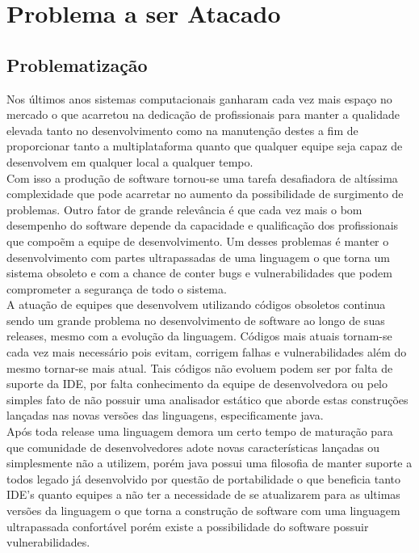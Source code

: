 \chapter{Problema a ser Atacado}
\section{Problematização}

Nos últimos anos sistemas computacionais ganharam cada vez mais espaço no mercado o que acarretou na dedicação de profissionais para manter a qualidade elevada tanto no desenvolvimento como na manutenção destes a fim de proporcionar tanto a multiplataforma quanto que qualquer equipe seja capaz de desenvolvem em qualquer local a qualquer tempo.\\

Com isso a produção de software tornou-se uma tarefa desafiadora de altíssima complexidade que pode acarretar no aumento da possibilidade de surgimento de problemas. Outro fator de grande relevância é que cada vez mais o bom desempenho do software depende da capacidade e qualificação dos profissionais que compoẽm a equipe de desenvolvimento. Um desses problemas é manter o desenvolvimento com partes ultrapassadas de uma linguagem o que torna um sistema obsoleto e com a chance de conter bugs e vulnerabilidades que podem comprometer a segurança de todo o sistema.\\


A atuação de equipes que desenvolvem utilizando códigos obsoletos continua sendo um grande problema no desenvolvimento de software ao longo de suas releases, mesmo com a evolução da linguagem. Códigos mais atuais tornam-se cada vez mais necessário pois evitam, corrigem falhas e vulnerabilidades além do mesmo tornar-se mais atual. Tais códigos não evoluem podem ser por falta de suporte da IDE, por falta conhecimento da equipe de desenvolvedora ou pelo simples fato de não possuir uma analisador estático que aborde estas construções lançadas nas novas versões das linguagens, especificamente java.\\


Após toda release uma linguagem demora um certo tempo de maturação para que comunidade de desenvolvedores adote novas características lançadas ou simplesmente não a utilizem, porém java possui uma filosofia de manter suporte a todos legado já desenvolvido por questão de portabilidade o que beneficia tanto IDE's quanto equipes a não ter a necessidade de se atualizarem para as ultimas versões da linguagem o que torna a construção de software com uma linguagem ultrapassada confortável porém existe a possibilidade do software possuir vulnerabilidades.\\

